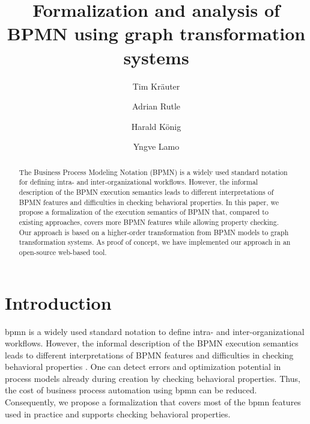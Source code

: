 \documentclass[runningheads]{llncs}
\begin{document}
%
\title{Formalization and analysis of BPMN using graph transformation systems}
%
%
\author{Tim Kr\"{a}uter \and
Adrian Rutle \and
Harald K\"{o}nig \and
Yngve Lamo}
%
%
%
\maketitle              %
%
\begin{abstract}
The Business Process Modeling Notation (BPMN) is a widely used standard notation for defining intra- and inter-organizational workflows.
However, the informal description of the BPMN execution semantics leads to different interpretations of BPMN features and difficulties in checking behavioral properties.
In this paper, we propose a formalization of the execution semantics of BPMN that, compared to existing approaches, covers more BPMN features while allowing property checking.
Our approach is based on a higher-order transformation from BPMN models to graph transformation systems.
As proof of concept, we have implemented our approach in an open-source web-based tool.

\end{abstract}

\section{Introduction}
\gls*{bpmn} \cite{objectmanagementgroupBusinessProcessModel2013} is a widely used standard notation to define intra- and inter-organizational workflows.
However, the informal description of the BPMN execution semantics leads to different interpretations of BPMN features and difficulties in checking behavioral properties \cite{corradiniFormalApproachAnalysis2021}.
One can detect errors and optimization potential in process models already during creation by checking behavioral properties.
Thus, the cost of business process automation using \gls*{bpmn} can be reduced.
Consequently, we propose a formalization that covers most of the \gls*{bpmn} features used in practice and supports checking behavioral properties.
\end{document}
